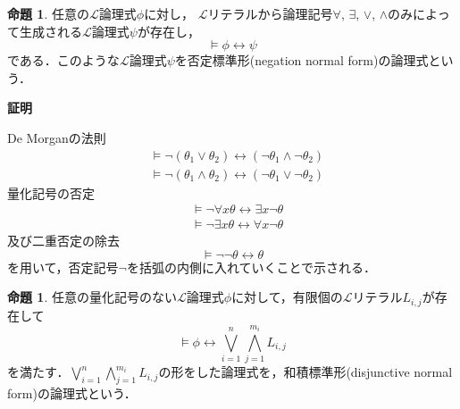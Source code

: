 \documentclass[uplatex, dvipdfmx]{jsarticle}
\makeatletter
\numberwithin{equation}{section}
\renewenvironment{proof}[1][\proofname]{\par
  \pushQED{\qed}%
  \normalfont \topsep6\p@\@plus6\p@\relax
  \trivlist
  \item\relax
  {\bfseries
  #1\@addpunct{.}}\hspace\labelsep\ignorespaces
}{
  \popQED\endtrivlist\@endpefalse
}
\theoremstyle{definition}
\newtheorem{proposition}[definition]{命題}
\renewcommand{\proofname}{\textbf{証明}}
\makeatother
\begin{document}
\begin{proposition}\label{proposition:nnt}
     任意の$\mathcal{L}$論理式$\phi$に対し，
     $\mathcal{L}$リテラルから論理記号$\forall$, $\exists$, $\lor$, $\land$のみによって生成される$\mathcal{L}$論理式$\psi$が存在し，
     \begin{equation}
          \models \phi \leftrightarrow \psi
     \end{equation}
     である．このような$\mathcal{L}$論理式$\psi$を否定標準形(negation normal form)の論理式という．
\end{proposition}
\begin{proof}
     De Morganの法則
     \begin{align}
          &\models \lnot (\theta_1 \lor \theta_2) \leftrightarrow (\lnot \theta_1 \land \lnot \theta_2)\\
          &\models \lnot (\theta_1 \land \theta_2) \leftrightarrow (\lnot \theta_1 \lor \lnot \theta_2)
     \end{align}
     量化記号の否定
     \begin{align}
          &\models \lnot \forall x \theta \leftrightarrow \exists x \lnot \theta\\
          &\models \lnot \exists x \theta \leftrightarrow \forall x \lnot \theta
     \end{align}
     及び二重否定の除去
     \begin{equation}
          \models \lnot \lnot \theta \leftrightarrow \theta
     \end{equation}
     を用いて，否定記号$\lnot$を括弧の内側に入れていくことで示される．
\end{proof}

\begin{proposition}\label{proposition:dnf}
     任意の量化記号のない$\mathcal{L}$論理式$\phi$に対して，有限個の$\mathcal{L}$リテラル$L_{i,j}$が存在して
     \begin{equation}
          \models \phi \leftrightarrow \bigvee_{i=1}^n \bigwedge_{j=1}^{m_i} L_{i,j}
     \end{equation}
     を満たす．$\bigvee_{i=1}^n \bigwedge_{j=1}^{m_i} L_{i,j}$の形をした論理式を，和積標準形(disjunctive normal form)の論理式という．
\end{proposition}
\end{document}
